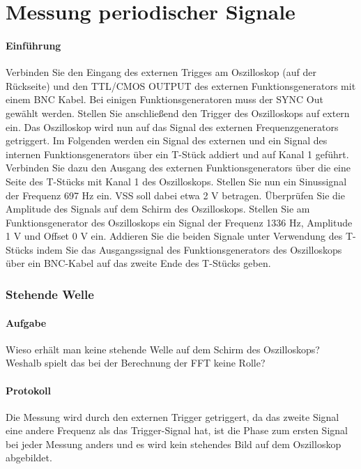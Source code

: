 \documentclass[10pt]{report}
\begin{document}
        \section{Messung periodischer Signale}
        \paragraph{Einführung}
        Verbinden Sie den Eingang des externen Trigges am Oszilloskop (auf der Rückseite) und
        den \glqq{}TTL/CMOS OUTPUT\grqq{} des externen Funktionsgenerators mit einem BNC Kabel.
        Bei einigen Funktionsgeneratoren muss der \glqq{}SYNC Out\grqq{} gewählt werden. Stellen Sie
        anschließend den Trigger des Oszilloskops auf \glqq{}extern\grqq{} ein. Das Oszilloskop wird nun auf
        das Signal des externen Frequenzgenerators getriggert.
        Im Folgenden werden ein Signal des externen und ein Signal des internen Funktionsgenerators
        über ein T-Stück addiert und auf Kanal 1 geführt.
        Verbinden Sie dazu den Ausgang des externen Funktionsgenerators über die eine Seite
        des T-Stücks mit Kanal 1 des Oszilloskops. Stellen Sie nun ein Sinussignal der Frequenz
        697 Hz ein. VSS soll dabei etwa 2 V betragen. Überprüfen Sie die Amplitude des Signals
        auf dem Schirm des Oszilloskops.
        Stellen Sie am Funktionsgenerator des Oszilloskops ein Signal der Frequenz 1336 Hz,
        Amplitude 1 V und Offset 0 V ein. Addieren Sie die beiden Signale unter Verwendung des
        T-Stücks indem Sie das Ausgangssignal des Funktionsgenerators des Oszilloskops über
        ein BNC-Kabel auf das zweite Ende des T-Stücks geben.

        \subsubsection{Stehende Welle}
        \paragraph{Aufgabe}
        Wieso erhält man keine stehende Welle auf dem Schirm des Oszilloskops? Weshalb
        spielt das bei der Berechnung der FFT keine Rolle?
        \paragraph{Protokoll}
        Die Messung wird durch den externen Trigger getriggert, da das zweite Signal
        eine andere Frequenz als das Trigger-Signal hat, ist die Phase zum ersten Signal
        bei jeder Messung anders und es wird kein stehendes Bild auf dem Oszilloskop
        abgebildet.
\end{document}
